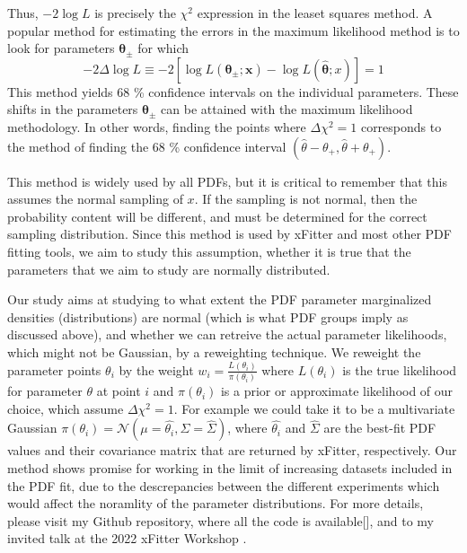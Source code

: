 Thus, $-2 \log L$ is precisely the $\chi^2$ expression in the leaset squares method.
A popular method for estimating the errors in the maximum likelihood method is to look for parameters $\mathbf{\theta_{\pm}}$ for which
\begin{equation}
    -2 \Delta \log L \equiv-2\left[\log L\left(\boldsymbol{\theta}_{\pm} ; \boldsymbol{x}\right)-\log L(\hat{\boldsymbol{\theta}} ; x)\right]=1
\end{equation}
This method yields 68 \% confidence intervals on the individual parameters. These shifts in the parameters $\boldsymbol{\theta_{\pm}}$ can be attained with the maximum likelihood methodology. In other words, finding the points where $\Delta \chi^2=1$ corresponds to the method of finding the 68 \% confidence interval $( \hat{\theta} - \theta_+, \hat{\theta} + \theta_+ )$.

This method is widely used by all PDFs, but it is critical to remember that this assumes the normal sampling of $x$. If the sampling is not normal, then the probability content will be different, and must be determined for the correct sampling distribution. Since this method is used by xFitter and most other PDF fitting tools, we aim to study this assumption, whether it is true that the parameters that we aim to study are normally distributed. 

Our study aims at studying to what extent the PDF parameter marginalized densities (distributions) are normal (which is what PDF groups imply as discussed above), and whether we can retreive the actual parameter likelihoods, which might not be Gaussian, by a reweighting technique. We reweight the parameter points $\theta_i$ by the weight $w_i = \frac{L(\theta_i)}{\pi (\theta_i)}$ where $L(\theta_i)$ is the true likelihood for parameter $\theta$ at point $i$ and $\pi(\theta_i)$ is a prior or approximate likelihood of our choice, which assume $\Delta \chi^2 =1$. For example we could take it to be a multivariate Gaussian $\pi(\theta_i) = \mathcal{N} (\mu = \hat{\theta_i}, \Sigma = \hat{\Sigma})$, where $\hat{\theta_i}$ and $\hat{\Sigma}$ are the best-fit PDF values and their covariance matrix that are returned by xFitter, respectively. Our method shows promise for working in the limit of increasing datasets included in the PDF fit, due to the descrepancies between the different experiments which would affect the noramlity of the parameter distributions. For more details, please visit my Github repository, where all the code is available[], and to my invited talk at the 2022 xFitter Workshop \cite{xFitterWorkshop}.











